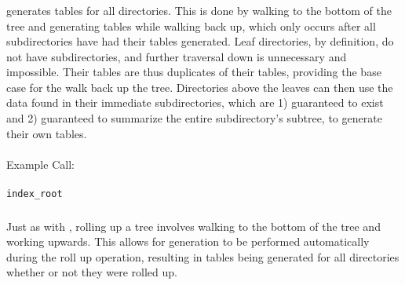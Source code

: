 \subsubsection{\gufitreesummaryall}
\gufitreesummaryall generates \treesummary tables for all
directories. This is done by walking to the bottom of the tree and
generating \treesummary tables while walking back up, which only
occurs after all subdirectories have had their \treesummary tables
generated. Leaf directories, by definition, do not have
subdirectories, and further traversal down is unnecessary and
impossible. Their \treesummary tables are thus duplicates of their
\summary tables, providing the base case for the walk back up the
tree. Directories above the leaves can then use the \treesummary data
found in their immediate subdirectories, which are 1) guaranteed to
exist and 2) guaranteed to summarize the entire subdirectory's
subtree, to generate their own \treesummary tables.
\\\\
Example Call:
\\\\
\indent \gufitreesummaryall \texttt{index\_root}

\subsubsection{\gufirollup}
Just as with \gufitreesummaryall, rolling up a tree involves walking
to the bottom of the tree and working upwards. This allows for
\treesummary generation to be performed automatically during the roll
up operation, resulting in \treesummary tables being generated for all
directories whether or not they were rolled up.
